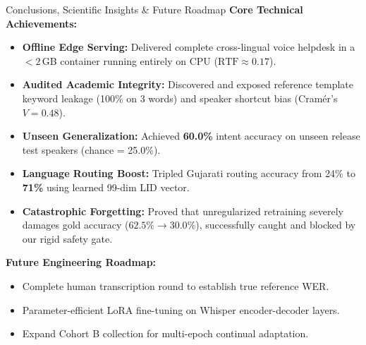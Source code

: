 \documentclass[10pt]{beamer}
\begin{document}
\begin{frame}{Conclusions, Scientific Insights \& Future Roadmap}
    \footnotesize
    \textbf{Core Technical Achievements:}
    \begin{itemize}\setlength{\itemsep}{2pt}
        \item \textbf{Offline Edge Serving:} Delivered complete cross-lingual voice helpdesk in a $<2$\,GB container running entirely on CPU ($\text{RTF} \approx 0.17$).
        \item \textbf{Audited Academic Integrity:} Discovered and exposed reference template keyword leakage (100\% on 3 words) and speaker shortcut bias (Cramér's $V = 0.48$).
        \item \textbf{Unseen Generalization:} Achieved \textbf{60.0\%} intent accuracy on unseen release test speakers (chance = 25.0\%).
        \item \textbf{Language Routing Boost:} Tripled Gujarati routing accuracy from 24\% to \textbf{71\%} using learned 99-dim LID vector.
        \item \textbf{Catastrophic Forgetting:} Proved that unregularized retraining severely damages gold accuracy ($62.5\% \to 30.0\%$), successfully caught and blocked by our rigid safety gate.
    \end{itemize}
    \vspace{3pt}
    \textbf{Future Engineering Roadmap:}
    \begin{itemize}\setlength{\itemsep}{1pt}
        \item Complete human transcription round to establish true reference WER.
        \item Parameter-efficient LoRA fine-tuning on Whisper encoder-decoder layers.
        \item Expand Cohort B collection for multi-epoch continual adaptation.
    \end{itemize}
\end{frame}
\end{document}
